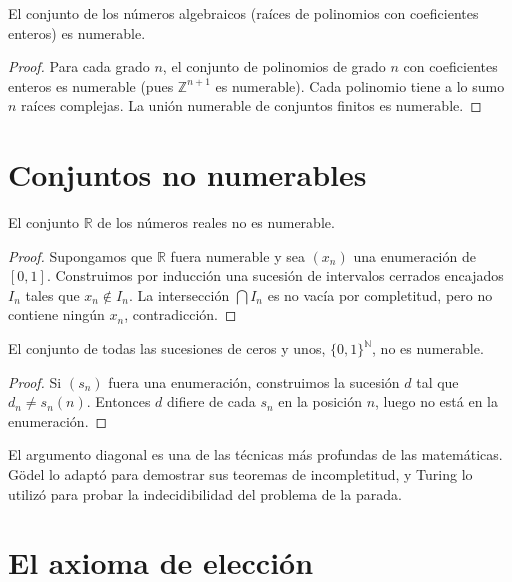 \begin{corollary}
El conjunto de los números algebraicos (raíces de polinomios con coeficientes enteros) es numerable.
\end{corollary}

\begin{proof}
Para cada grado $n$, el conjunto de polinomios de grado $n$ con coeficientes enteros es numerable (pues $\mathbb{Z}^{n+1}$ es numerable). Cada polinomio tiene a lo sumo $n$ raíces complejas. La unión numerable de conjuntos finitos es numerable.
\end{proof}

\section{Conjuntos no numerables}

\begin{theorem}[Cantor]
\label{teo:cantor-uncountable}
El conjunto $\mathbb{R}$ de los números reales no es numerable.
\end{theorem}
\begin{proof}
Supongamos que $\mathbb{R}$ fuera numerable y sea $(x_n)$ una enumeración de $[0,1]$. Construimos por inducción una sucesión de intervalos cerrados encajados $I_n$ tales que $x_n\notin I_n$. La intersección $\bigcap I_n$ es no vacía por completitud, pero no contiene ningún $x_n$, contradicción.
\end{proof}

\begin{theorem}
El conjunto de todas las sucesiones de ceros y unos, $\{0,1\}^{\mathbb{N}}$, no es numerable.
\end{theorem}
\begin{proof}
Si $(s_n)$ fuera una enumeración, construimos la sucesión $d$ tal que $d_n\neq s_{n}(n)$. Entonces $d$ difiere de cada $s_n$ en la posición $n$, luego no está en la enumeración.
\end{proof}

\begin{remark}
El argumento diagonal es una de las técnicas más profundas de las matemáticas. Gödel lo adaptó para demostrar sus teoremas de incompletitud, y Turing lo utilizó para probar la indecidibilidad del problema de la parada.
\end{remark}

\section{El axioma de elección}

